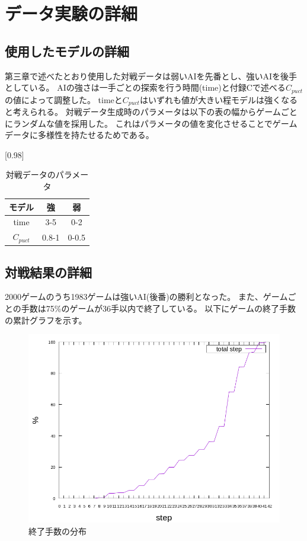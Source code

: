 \chapter{データ実験の詳細}
\label{chap:data}
\section{使用したモデルの詳細}
第三章で述べたとおり使用した対戦データは弱いAIを先番とし、強いAIを後手としている。
AIの強さは一手ごとの探索を行う時間(time)と付録Cで述べる$C_{puct}$の値によって調整した。
timeと$C_{puct}$はいずれも値が大きい程モデルは強くなると考えられる。
対戦データ生成時のパラメータは以下の表の幅からゲームごとにランダムな値を採用した。
これはパラメータの値を変化させることでゲームデータに多様性を持たせるためである。
\begin{table}[H]
	\caption{対戦データのパラメータ}
	\centering
	\scalebox{0.98}[0.98]{
		\begin{tabular}{c|c|c}
			モデル&強&弱\\ \hline
			time    & 3-5 & 0-2 \\ 
			$C_{puct}$ & 0.8-1   & 0-0.5 \\

		\end{tabular}
	}
	\label{table:battle}
\end{table}

\section{対戦結果の詳細}
2000ゲームのうち1983ゲームは強いAI(後番)の勝利となった。
また、ゲームごとの手数は75\%のゲームが36手以内で終了している。
以下にゲームの終了手数の累計グラフを示す。
\begin{figure}[t]
	\centering
	\includegraphics[width=\linewidth]{./figure/stepCum.png}
	\caption{終了手数の分布}
	\label{fig:stepCum}
\end{figure}
